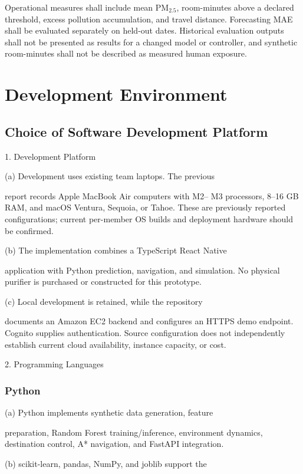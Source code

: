 \documentclass[conference]{IEEEtran}
\newcommand{\pmfine}{\ensuremath{\mathrm{PM}_{2.5}}}
\begin{document}
Operational measures shall include mean \pmfine{}, room-minutes above a declared threshold, excess pollution accumulation, and travel distance. Forecasting MAE shall be evaluated separately on held-out dates. Historical evaluation outputs shall not be presented as results for a changed model or controller, and synthetic room-minutes shall not be described as measured human exposure.

\section{Development Environment}

\subsection{Choice of Software Development Platform}

1. Development Platform

(a) Development uses existing team laptops. The previous

report records Apple MacBook Air computers with M2-- M3 processors, 8--16 GB RAM, and macOS Ventura, Sequoia, or Tahoe. These are previously reported configurations; current per-member OS builds and deployment hardware should be confirmed.

(b) The implementation combines a TypeScript React Native

application with Python prediction, navigation, and simulation. No physical purifier is purchased or constructed for this prototype.

(c) Local development is retained, while the repository

documents an Amazon EC2 backend and configures an HTTPS demo endpoint. Cognito supplies authentication. Source configuration does not independently establish current cloud availability, instance capacity, or cost.

2. Programming Languages

\subsubsection{Python \cite{ref5}}

(a) Python implements synthetic data generation, feature

preparation, Random Forest training/inference, environment dynamics, destination control, A* navigation, and FastAPI integration.

(b) scikit-learn, pandas, NumPy, and joblib support the
\end{document}
